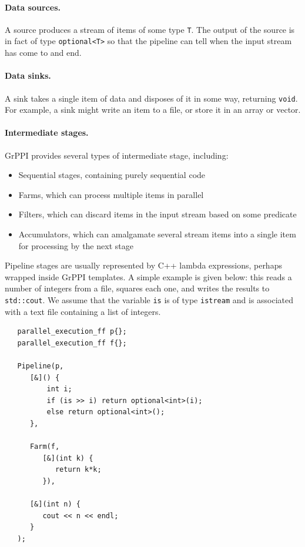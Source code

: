 \paragraph{Data sources.}  A source produces a stream of items of some type \verb|T|.
The output of the source is in fact of type \verb|optional<T>| so
that the pipeline can tell when the input stream has come to and
end.


\paragraph{Data sinks.}
A sink takes a single item of data and disposes of it in some way, returning \verb|void|.
For example, a sink might write an item to a file, or store it in an array or vector.

\paragraph{Intermediate stages.} GrPPI provides several types of intermediate stage, including:
\begin{itemize}
\item Sequential stages, containing purely sequential code
\item Farms, which can process multiple items in parallel
\item Filters, which can discard items in the input stream based on some predicate
\item Accumulators, which can amalgamate several stream items into a single item for processing by the next stage
\end{itemize}

Pipeline stages are usually represented by C++ lambda expressions,
perhaps wrapped inside GrPPI templates.  A simple example is given
below: this reads a number of integers from a file, squares each one,
and writes the results to \verb|std::cout|. We assume that the
variable \verb|is| is of type \verb|istream| and is associated
with a text file containing a list of integers.

{\scriptsize
\begin{lstlisting}
   parallel_execution_ff p{};
   parallel_execution_ff f{};

   Pipeline(p,
      [&]() {
          int i;
          if (is >> i) return optional<int>(i);
          else return optional<int>();
      },

      Farm(f,
         [&](int k) {
            return k*k;
         }),

      [&](int n) {
         cout << n << endl;
      }
   );
\end{lstlisting}
}

